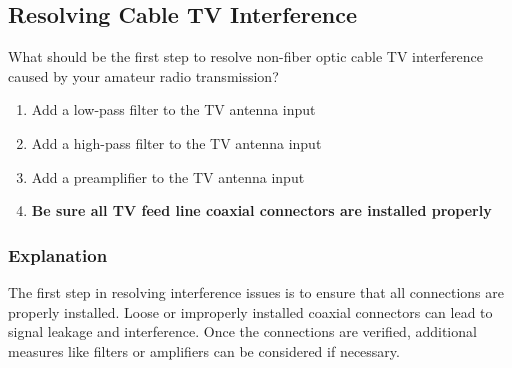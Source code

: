 \subsection{Resolving Cable TV Interference}
\label{T7B09}

\begin{tcolorbox}[colback=gray!10!white,colframe=black!75!black,title=T7B09]
What should be the first step to resolve non-fiber optic cable TV interference caused by your amateur radio transmission?
\begin{enumerate}[noitemsep]
    \item Add a low-pass filter to the TV antenna input
    \item Add a high-pass filter to the TV antenna input
    \item Add a preamplifier to the TV antenna input
    \item \textbf{Be sure all TV feed line coaxial connectors are installed properly}
\end{enumerate}
\end{tcolorbox}

\subsubsection*{Explanation}
The first step in resolving interference issues is to ensure that all connections are properly installed. Loose or improperly installed coaxial connectors can lead to signal leakage and interference. Once the connections are verified, additional measures like filters or amplifiers can be considered if necessary.